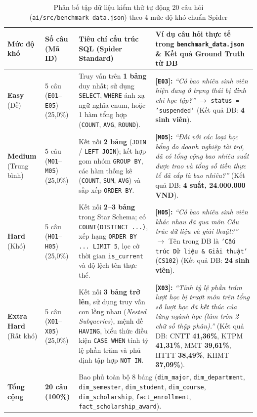 \documentclass[12pt,a4paper]{report}
\begin{document}
\begin{table}[H]
\centering
\caption{Phân bố tập dữ liệu kiểm thử tự động 20 câu hỏi (\texttt{ai/src/benchmark\_data.json}) theo 4 mức độ khó chuẩn Spider \cite{yu2018spider}}
\label{tab:benchmark_difficulty}
\renewcommand{\arraystretch}{1.3}
\footnotesize
\begin{tabular}{@{}p{2.3cm}p{1.5cm}p{4.3cm}p{6.4cm}@{}}
\toprule
\textbf{Mức độ khó} & \textbf{Số câu (Mã ID)} & \textbf{Tiêu chí cấu trúc SQL (Spider Standard)} & \textbf{Ví dụ câu hỏi thực tế trong \texttt{benchmark\_data.json} \& Kết quả Ground Truth từ DB} \\
\midrule
\textbf{Easy} (Dễ) & 5 câu (\texttt{E01}--\texttt{E05}) (25,0\%) & Truy vấn trên \textbf{1 bảng} duy nhất; sử dụng \texttt{SELECT}, \texttt{WHERE} ánh xạ ngữ nghĩa enum, hoặc 1 hàm tổng hợp (\texttt{COUNT}, \texttt{AVG}, \texttt{ROUND}). & \textbf{[\texttt{E03}]:} \textit{``Có bao nhiêu sinh viên hiện đang ở trạng thái bị đình chỉ học tập?''} $\rightarrow$ \texttt{status = 'suspended'} (Kết quả DB: \textbf{4 sinh viên}). \\
\addlinespace
\textbf{Medium} (Trung bình) & 5 câu (\texttt{M01}--\texttt{M05}) (25,0\%) & Kết nối \textbf{2 bảng} (\texttt{JOIN} / \texttt{LEFT JOIN}); kết hợp gom nhóm \texttt{GROUP BY}, các hàm thống kê (\texttt{COUNT}, \texttt{SUM}, \texttt{AVG}) và sắp xếp \texttt{ORDER BY}. & \textbf{[\texttt{M05}]:} \textit{``Đối với các loại học bổng do doanh nghiệp tài trợ, đã có tổng cộng bao nhiêu suất được trao và tổng số tiền thực tế đã cấp là bao nhiêu?''} (Kết quả DB: \textbf{4 suất, 24.000.000 VND}). \\
\addlinespace
\textbf{Hard} (Khó) & 5 câu (\texttt{H01}--\texttt{H05}) (25,0\%) & Kết nối \textbf{2--3 bảng} trong Star Schema; có \texttt{COUNT(DISTINCT ...)}, xếp hạng \texttt{ORDER BY ... LIMIT 5}, lọc cờ thời gian \texttt{is\_current} và độ lệch tên thực thể. & \textbf{[\texttt{H05}]:} \textit{``Có bao nhiêu sinh viên khác nhau đã qua môn Cấu trúc dữ liệu và giải thuật?''} $\rightarrow$ Tên trong DB là \texttt{'Cấu trúc Dữ liệu \& Giải thuật'} (\texttt{CS102}) (Kết quả DB: \textbf{24 sinh viên}). \\
\addlinespace
\textbf{Extra Hard} (Rất khó) & 5 câu (\texttt{X01}--\texttt{X05}) (25,0\%) & Kết nối \textbf{3 bảng trở lên}, sử dụng truy vấn con lồng nhau (\textit{Nested Subqueries}), mệnh đề \texttt{HAVING}, biểu thức điều kiện \texttt{CASE WHEN} tính tỷ lệ phần trăm và phủ định tập hợp \texttt{NOT IN}. & \textbf{[\texttt{X03}]:} \textit{``Tính tỷ lệ phần trăm lượt học bị trượt môn trên tổng số lượt học đã kết thúc của từng ngành học (làm tròn 2 chữ số thập phân).''} (Kết quả DB: CNTT \textbf{41,36\%}, KTPM \textbf{41,31\%}, MMT \textbf{39,61\%}, HTTT \textbf{38,49\%}, KHMT \textbf{37,09\%}). \\
\midrule
\textbf{Tổng cộng} & \textbf{20 câu (100\%)} & \multicolumn{2}{l}{Bao phủ toàn bộ 8 bảng (\texttt{dim\_major}, \texttt{dim\_department}, \texttt{dim\_semester}, \texttt{dim\_student}, \texttt{dim\_course}, \texttt{dim\_scholarship}, \texttt{fact\_enrollment}, \texttt{fact\_scholarship\_award}).} \\
\bottomrule
\end{tabular}
\end{table}
\end{document}
